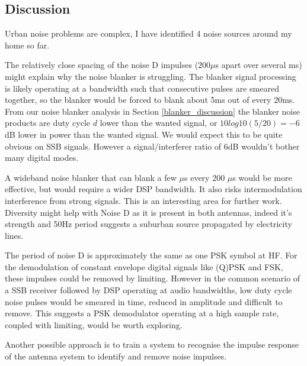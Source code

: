 \documentclass{article}
\begin{document}
\subsection{Discussion}

Urban noise problems are complex, I have identified 4 noise sources around my home so far.

The relatively close spacing of the noise D impulses (200$\mu$s apart over several ms) might explain why the noise blanker is struggling.  The blanker signal processing is likely operating at a bandwidth such that consecutive pulses are smeared together, so the blanker would be forced to blank about 5ms out of every 20ms. From our noise blanker analysis in Section \ref{blanker_discussion} the blanker noise products are duty cycle $d$ lower than the wanted signal, or $10log10(5/20)=-6$ dB lower in power than the wanted signal.  We would expect this to be quite obvious on SSB signals.  However a signal/interferer ratio of 6dB wouldn't bother many digital modes.

A wideband noise blanker that can blank a few $\mu$s every 200 $\mu$s would be more effective, but would require a wider DSP bandwidth.  It also risks intermodulation interference from strong signals.  This is an interesting area for further work.  Diversity might help with Noise D as it is present in both antennas, indeed it's strength and 50Hz period suggests a suburban source propagated by electricity lines.

The period of noise D is approximately the same as one PSK symbol at HF.  For the demodulation of constant envelope digital signals like (Q)PSK and FSK, these impulses could be removed by limiting.  However in the common scenario of a SSB receiver followed by DSP operating at audio bandwidths, low duty cycle noise pulses would be smeared in time, reduced in amplitude and difficult to remove.  This suggests a PSK demodulator operating at a high sample rate, coupled with limiting, would be worth exploring.

Another possible approach is to train a system to recognise the impulse response of the antenna system to identify and remove noise impulses.



\end{document}
